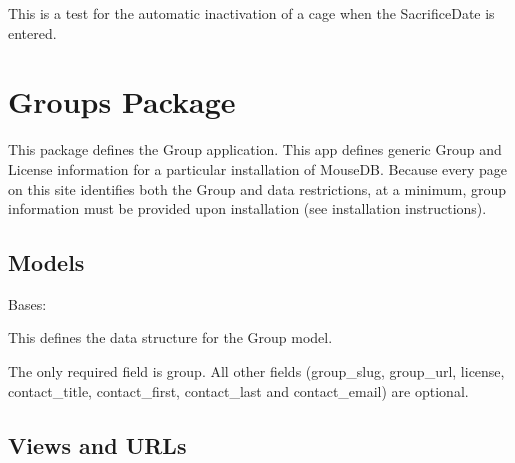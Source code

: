 \documentclass[letterpaper,10pt,english]{sphinxmanual}
\begin{document}
\begin{fulllineitems}
\begin{fulllineitems}
\begin{fulllineitems}
\end{fulllineitems}


\begin{fulllineitems}
\label{api:timed_mating.tests.GroupsModelTests.test_set_plugevet_inactive}
This is a test for the automatic inactivation of a cage when the SacrificeDate is entered.

\end{fulllineitems}


\end{fulllineitems}



\section{Groups Package}
\label{api:module-groups}\label{api:groups-package}
This package defines the Group application.
This app defines generic Group and License information for a particular installation of MouseDB.  
Because every page on this site identifies both the Group and data restrictions, at a minimum, group information must be provided upon installation (see installation instructions).


\subsection{Models}
\label{api:id11}\label{api:module-groups.models}

\begin{fulllineitems}
\label{api:groups.models.Group}
Bases: 

This defines the data structure for the Group model.

The only required field is group.
All other fields (group\_slug, group\_url, license, contact\_title, contact\_first, contact\_last and contact\_email) are optional.

\end{fulllineitems}



\subsection{Views and URLs}
\label{api:id12}\label{api:module-groups.views}


\end{fulllineitems}
\end{document}
